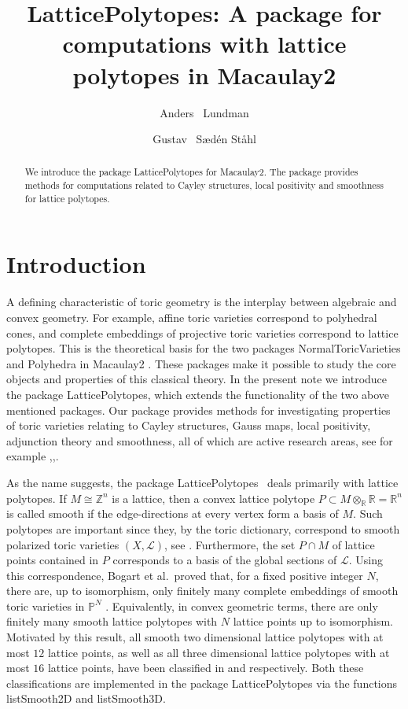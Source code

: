 \documentclass{amsart}
\title[Lattice Polytopes in Macaulay2]{LatticePolytopes: A package for computations with lattice polytopes in Macaulay2}
\author{Anders \ Lundman}
\author{Gustav \ S\ae d\'{e}n St\aa hl}
\begin{document}
\maketitle

\begin{abstract}
We introduce the package LatticePolytopes for Macaulay2. The package provides methods for computations related to Cayley structures, local positivity and smoothness for lattice polytopes. 

\end{abstract}

\section{Introduction}
A defining characteristic of toric geometry is the interplay between algebraic and convex geometry. For example, affine toric varieties correspond to polyhedral cones, and complete embeddings of projective toric varieties correspond to lattice polytopes. This is the theoretical basis for the two packages  \textsf{NormalToricVarieties} and \textsf{Polyhedra} \cite{Polyh} in \textsf{Macaulay2} \cite{M2}. These packages make it possible to study the core objects and properties of this classical theory. In the present note we introduce the package \textsf{LatticePolytopes}, which extends the functionality of the two above mentioned packages. Our package provides methods for investigating properties of toric varieties relating to Cayley structures, Gauss maps, local positivity, adjunction theory and smoothness, all of which are active research areas, see for example \cite{primer},\cite{PolyAdj},\cite{Lazar}. 

As the name suggests, the package {\textsf{LatticePolytopes}\ }  deals primarily with lattice polytopes. If $M\cong {\mathbb{Z}}^n$ is a lattice, then a convex lattice polytope $P\subset M\otimes_{\mathbb{R}} {\mathbb{R}}={\mathbb{R}}^n$ is called smooth if the edge-directions at every vertex form a basis of $M$. Such polytopes are important since they, by the toric dictionary, correspond to smooth polarized toric varieties $(X,{\mathscr{L}})$, see \cite[Theorem~2.4.3]{Cox}. Furthermore, the set $P\cap M$ of lattice points contained in $P$ corresponds to a basis of the global sections of ${\mathscr{L}}$. Using this correspondence, Bogart et al.\ proved that, for a fixed positive integer $N$, there are, up to isomorphism, only finitely many complete embeddings of smooth toric varieties in ${\mathbb{P}}^N$ \cite{finiteSLP}. Equivalently, in convex geometric terms, there are only finitely many smooth lattice polytopes with $N$ lattice points up to isomorphism. Motivated by this result, all smooth two dimensional lattice polytopes with at most $12$ lattice points, as well as all three dimensional lattice polytopes with at most $16$ lattice points, have been 
classified in \cite{lorenz} and \cite{myclass} respectively. Both these classifications are implemented  in the package \textsf{LatticePolytopes} via the functions \textsf{listSmooth2D} and \textsf{listSmooth3D}.
\end{document}
